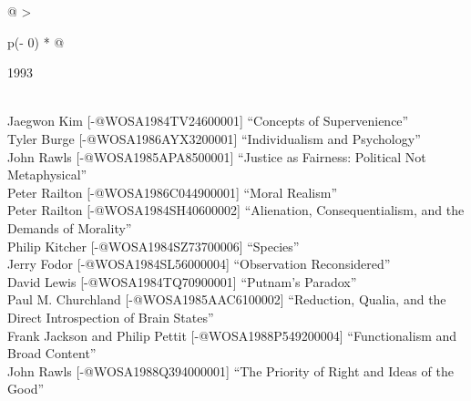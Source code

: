 \documentclass[
  10pt,
  letterpaper,
  DIV=11,
  numbers=noendperiod,
  twoside]{scrartcl}
\begin{document}
\begin{longtable}[]{@{}
  >{\raggedright\arraybackslash}p{(\columnwidth - 0\tabcolsep) * }@{}}

\caption{\label{tbl-top-ten-1984}Most cited articles published less than
ten years ago as of 1993.}

\tabularnewline

\toprule\noalign{}
\begin{minipage}[b]{\linewidth}\raggedright
1993
\end{minipage} \\
\midrule\noalign{}
\endhead
\bottomrule\noalign{}
\endlastfoot
Jaegwon Kim {[}-@WOSA1984TV24600001{]} ``Concepts of Supervenience'' \\
Tyler Burge {[}-@WOSA1986AYX3200001{]} ``Individualism and
Psychology'' \\
John Rawls {[}-@WOSA1985APA8500001{]} ``Justice as Fairness: Political
Not Metaphysical'' \\
Peter Railton {[}-@WOSA1986C044900001{]} ``Moral Realism'' \\
Peter Railton {[}-@WOSA1984SH40600002{]} ``Alienation, Consequentialism,
and the Demands of Morality'' \\
Philip Kitcher {[}-@WOSA1984SZ73700006{]} ``Species'' \\
Jerry Fodor {[}-@WOSA1984SL56000004{]} ``Observation Reconsidered'' \\
David Lewis {[}-@WOSA1984TQ70900001{]} ``Putnam's Paradox'' \\
Paul M. Churchland {[}-@WOSA1985AAC6100002{]} ``Reduction, Qualia, and
the Direct Introspection of Brain States'' \\
Frank Jackson and Philip Pettit {[}-@WOSA1988P549200004{]}
``Functionalism and Broad Content'' \\
John Rawls {[}-@WOSA1988Q394000001{]} ``The Priority of Right and Ideas
of the Good'' \\

\end{longtable}
\end{document}
